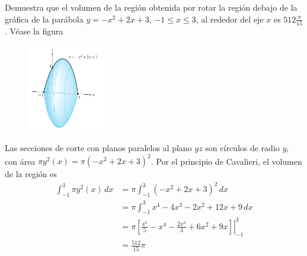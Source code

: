 Demuestra que el volumen de la región obtenida 
por rotar la región debajo de la gráfica de la parábola
$y=-x^2+2x+3$, $-1\leq x\leq 3$, al rededor del eje
$x$ es $512 \frac{\pi}{15}$. 
Véase la figura
\begin{figure}[H]
    \begin{center}
        \includegraphics[width=0.3\textwidth]{img/Ej2/ej8b.png}
    \end{center}
\end{figure}
\begin{solution}
    Las secciones de corte con planos paralelos al plano \( yz \) son círculos de 
    radio \( y \), con área \( \pi y^2(x) = \pi (-x^2+2x+ 3)^2 \). Por el principio de 
    Cavalieri, el volumen de la región es 
    \begin{align*}
        \int_{-1}^3
        \pi y^2(x)
        \, dx
        &=
        \pi
        \int_{-1}^3
        (-x^2+2x+3)^2
        \, dx\\
        &=
        \pi
        \int_{-1}^3
        x^4-4x^3-2x^2+12x+9
        \,dx\\
        &=
        \left.
        \pi
        \left[ \frac{x^5}{5} -x^4- \frac{2x^3}{3} +6x^2+9x \right] \right|_{-1}^3\\
        &=
        \frac{512}{15} \pi
    \end{align*}
\end{solution}
